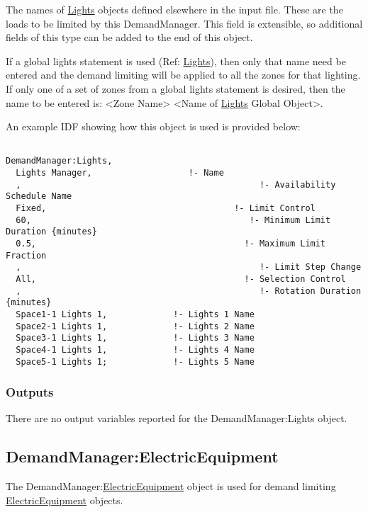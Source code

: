 The names of \hyperref[lights-000]{Lights} objects defined elsewhere in the input file. These are the loads to be limited by this DemandManager.  This field is extensible, so additional fields of this type can be added to the end of this object.

If a global lights statement is used (Ref: \hyperref[lights-000]{Lights}), then only that name need be entered and the demand limiting will be applied to all the zones for that lighting. If only one of a set of zones from a global lights statement is desired, then the name to be entered is: \textless{}Zone Name\textgreater{} \textless{}Name of \hyperref[lights-000]{Lights} Global Object\textgreater{}.

An example IDF showing how this object is used is provided below:

\begin{lstlisting}

DemandManager:Lights,
  Lights Manager,                   !- Name
  ,                                               !- Availability Schedule Name
  Fixed,                                     !- Limit Control
  60,                                           !- Minimum Limit Duration {minutes}
  0.5,                                         !- Maximum Limit Fraction
  ,                                               !- Limit Step Change
  All,                                         !- Selection Control
  ,                                               !- Rotation Duration {minutes}
  Space1-1 Lights 1,             !- Lights 1 Name
  Space2-1 Lights 1,             !- Lights 2 Name
  Space3-1 Lights 1,             !- Lights 3 Name
  Space4-1 Lights 1,             !- Lights 4 Name
  Space5-1 Lights 1;             !- Lights 5 Name
\end{lstlisting}

\subsubsection{Outputs}\label{outputs-2-005}

There are no output variables reported for the DemandManager:Lights object.

\subsection{DemandManager:ElectricEquipment}\label{demandmanagerelectricequipment}

The DemandManager:\hyperref[electricequipment]{ElectricEquipment} object is used for demand limiting \hyperref[electricequipment]{ElectricEquipment} objects.

